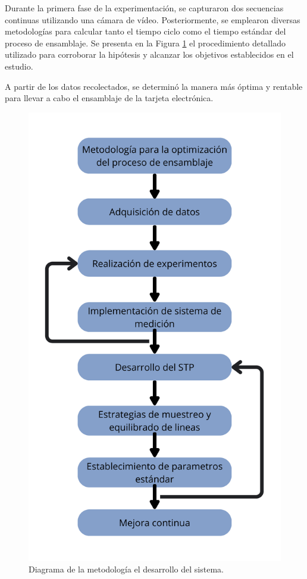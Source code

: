 Durante la primera fase de la experimentación, se capturaron dos secuencias continuas utilizando una cámara de vídeo. Posteriormente, se emplearon diversas metodologías para calcular tanto el tiempo ciclo como el tiempo estándar del proceso de ensamblaje. Se presenta en la Figura \ref{fig:diagramaMetodologia} el procedimiento detallado utilizado para corroborar la hipótesis y alcanzar los objetivos establecidos en el estudio.

A partir de los datos recolectados, se determinó la manera más óptima y rentable para llevar a cabo el ensamblaje de la tarjeta electrónica.


\begin{figure}[H]
    \centering
    \includegraphics[scale=0.181]{15/img/diagramaMetodologia.pdf}
    \caption{Diagrama de la metodología el desarrollo del sistema.}
    \label{fig:diagramaMetodologia}
\end{figure}


